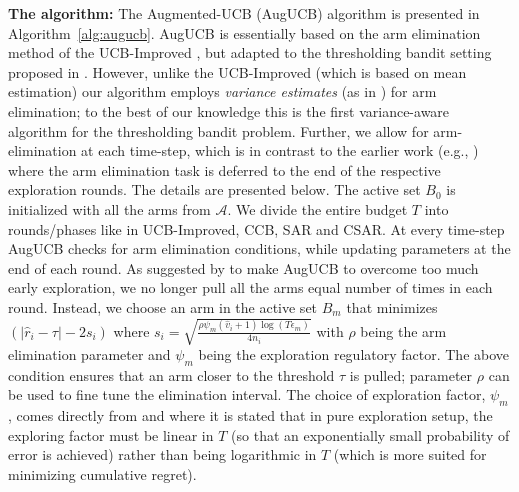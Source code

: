 \documentclass[MS,synopsis]{iitmdiss}
\begin{document}
\textbf{The algorithm:} The Augmented-UCB (AugUCB) algorithm is presented in Algorithm~\ref{alg:augucb}.
AugUCB is essentially based on the arm elimination method of the UCB-Improved \citep{auer2010ucb}, but adapted to the thresholding bandit setting proposed in \cite{locatelli2016optimal}. However, unlike the UCB-Improved (which is based on mean estimation) our algorithm employs \emph{variance estimates} (as in \cite{audibert2009exploration}) for arm elimination; to the best of our knowledge this is the first variance-aware  algorithm for the thresholding bandit problem. Further, we allow for arm-elimination at each time-step, which is in contrast to the earlier work (e.g., \cite{auer2010ucb,chen2014combinatorial}) where the arm elimination task is deferred to the end of the respective exploration rounds. The details are presented below. The active set $B_{0}$ is initialized with all the arms from $\mathcal{A}$. We divide the entire budget $T$ into rounds/phases like in UCB-Improved, CCB, SAR and CSAR. At every time-step AugUCB checks for arm elimination conditions, while updating parameters at the end of each round. As suggested by \cite{liu2016modification} to make AugUCB to overcome too much early exploration, we no longer pull all the arms equal number of times in each round. Instead, we choose an arm in the active set $B_m$ that minimizes $(|\hat{r}_{i} - \tau |-2s_i)$ where $s_i  = \sqrt{\frac{\rho\psi_m (\hat{v}_{i}+1) \log ( T \epsilon_{m})}{4 n_{i}}}$ with $\rho$ being the arm elimination parameter and $\psi_{m}$ being the exploration regulatory factor.
The above condition ensures that an arm closer to the threshold $\tau$ is pulled; 
parameter $\rho$ can be used to fine tune the elimination interval.
The choice of exploration factor, $\psi_m$, comes directly from \cite{audibert2010best} and \cite{bubeck2011pure} where it is  stated that in pure exploration setup, the exploring factor must be linear in $T$ (so that an exponentially small probability of error is achieved) rather than being logarithmic in $T$ (which is more suited for minimizing cumulative regret).
\end{document}
